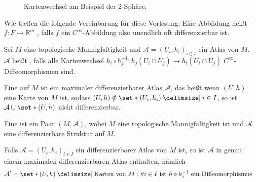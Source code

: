 \begin{figure}
	\caption{Kartenwechsel am Beispiel der 2-Sphäre.}
\end{figure}

Wie treffen die folgende Vereinbarung für diese Vorlesung: Eine Abbildung heißt $f \colon F \to \mathbb{R}^m$ , falls $f$ ein $C^\infty$-Abbildung also unendlich oft differenzierbar ist.

\begin{definition}[{name=[differenzierbare Struktur]}]
	Sei $M$ eine topologische Mannigfaltigkeit und $\mathcal{A} = (U_i,h_i)_{i \in I}$ ein Atlas von $M$.
	$\mathcal{A}$ heißt , falls alle Kartenwechsel $h_i \circ h_j^{-1} \colon h_j(U_i \cap U_j) \to h_i(U_i \cap U_j)$  $C^\infty$-Diffeomorphismen sind.
	
	Eine  auf $M$ ist ein maximaler differenzierbarer Atlas $\mathcal{A}$, das heißt wenn $(U,h)$ eine Karte von $M$ ist, sodass $(U,h) \notin \set*{(U_i,h_i) \given i \in I}$, so ist $\mathcal{A} \cup \set*{(U,h)}$ nicht differenzierbar.
	
	Eine  ist ein Paar $(M,\mathcal{A})$, wobei $M$ eine topologische Mannigfaltigkeit ist und $\mathcal{A}$ eine differenzierbare Struktur auf $M$.
\end{definition}

\begin{bemerkung}[{name=[jeder Atlas ist in einem maximalen enthalten]}]
	Falls $\mathcal{A}= (U_i,h_i)_{i \in I}$ ein differenzierbarer Atlas von $M$ ist, so ist $\mathcal{A}$ in genau einem maximalen differenzierbaren Atlas enthalten, nämlich 
	\[
		\mathcal{A}' = \set*{(U,h) \given \text{Karten von }M : \forall i \in I  \text{ ist } h \circ  h_i^{-1} \text{ ein Diffeomorphismus}}
	\]
\end{bemerkung}

